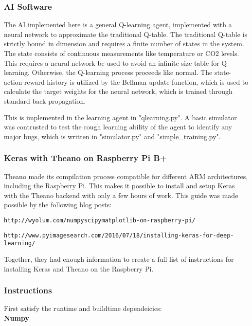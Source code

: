 \subsubsection{AI Software}
The AI implemented here is a general Q-learning agent, implemented with a neural network to approximate the traditional Q-table. The traditional Q-table is strictly bound in dimension and requires a finite number of states in the system. The state consists of continuous measurements like temperature or CO2 levels. This requires a neural network be used to avoid an infinite size table for Q-learning. Otherwise, the Q-learning process proceeds like normal. The state-action-reward history is utilized by the Bellman update function, which is used to calculate the target weights for the neural network, which is trained through standard back propagation.

This is implemented in the learning agent in "qlearning.py". A basic simulator was contrusted to test the rough learning ability of the agent to identify any major bugs, which is written in "simulator.py" and "simple\_training.py". \\

\subsubsection*{Keras with Theano on Raspberry Pi B+}

Theano made its compilation process compatible for different ARM architectures, including the Raspberry Pi. This makes it possible to install and setup Keras with the Theano backend with only a few hours of work.
This guide was made possible by the following blog posts:

\verb|http://wyolum.com/numpyscipymatplotlib-on-raspberry-pi/|

\verb|http://www.pyimagesearch.com/2016/07/18/installing-keras-for-deep-learning/|

Together, they had enough information to create a full list of instructions for installing Keras and Theano on the Raspberry Pi.\\

\subsubsection*{Instructions}

First satisfy the runtime and buildtime dependeicies: \\

\textbf{Numpy}

